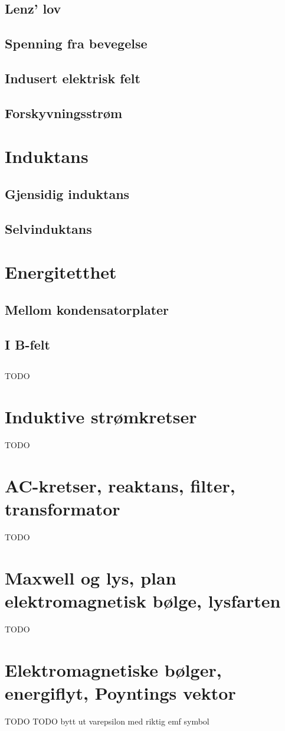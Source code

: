 \documentclass{article}
\begin{document}
    \subsection{Lenz' lov}
      
    \subsection{Spenning fra bevegelse} %
      
    \subsection{Indusert elektrisk felt}
      
    \subsection{Forskyvningsstrøm}
      
  \section{Induktans}
    \subsection{Gjensidig induktans}
      
    \subsection{Selvinduktans}
      
  \section{Energitetthet}
    \subsection{Mellom kondensatorplater}
      
    \subsection{I B-felt}
      
    \subsection{}
      TODO
  \section{Induktive strømkretser}
    TODO
  \section{AC-kretser, reaktans, filter, transformator}
    TODO
  \section{Maxwell og lys, plan elektromagnetisk bølge, lysfarten}
    TODO
  \section{Elektromagnetiske bølger, energiflyt, Poyntings vektor}
    TODO
  TODO bytt ut varepsilon med riktig emf symbol
\end{document}
